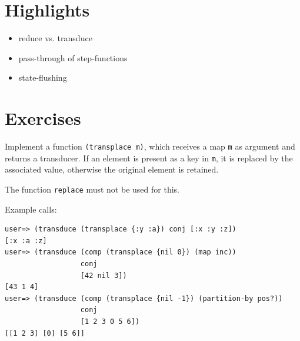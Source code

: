 \documentclass[11pt,a4paper]{article}
\begin{document}
\section{Highlights}

\begin{itemize}
    \item reduce vs. transduce
    \item pass-through of step-functions
    \item state-flushing
\end{itemize}



\section{Exercises}

\begin{exercise}[Transducer]

Implement a function \verb|(transplace m)|,
which receives a map \verb|m| as argument and returns a transducer.
If an element is present as a key in \verb|m|,
it is replaced by the associated value,
otherwise the original element is retained.

The function \texttt{replace} must not be used for this.

\vspace{8px}
Example calls:
\begin{verbatim}
user=> (transduce (transplace {:y :a}) conj [:x :y :z])
[:x :a :z]
user=> (transduce (comp (transplace {nil 0}) (map inc))
                  conj
                  [42 nil 3])
[43 1 4]
user=> (transduce (comp (transplace {nil -1}) (partition-by pos?)) 
                  conj
                  [1 2 3 0 5 6])
[[1 2 3] [0] [5 6]]
\end{verbatim} 
\end{exercise} 
\end{document}
